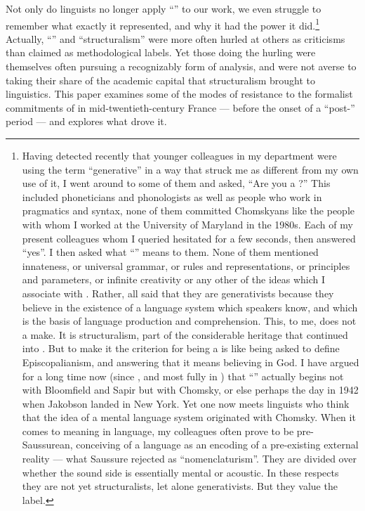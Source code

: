\documentclass[output=paper]{langscibook}
\begin{document}
Not only do linguists no longer apply ``'' to our work, we even struggle to remember what exactly it represented, and why it had the power it did.\footnote{Having detected recently that younger colleagues in my department were using the term ``generative'' in a way that struck me as different from my own use of it, I went around to some of them and asked, ``Are you a ?'' This included phoneticians and phonologists as well as people who work in pragmatics and syntax, none of them committed Chomskyans like the people with whom I worked at the University of Maryland in the 1980s. Each of my present colleagues whom I queried hesitated for a few seconds, then answered ``yes''. I then asked what ``'' means to them. None of them mentioned innateness, or universal grammar, or rules and representations, or principles and parameters, or infinite creativity or any other of the ideas which I associate with . Rather, all said that they are generativists because they believe in the existence of a language system which speakers know, and which is the basis of language production and comprehension. This, to me, does not a  make. It is structuralism, part of the considerable  heritage that continued into . But to make it the criterion for being a  is like being asked to define Episcopalianism, and answering that it means believing in God. I have argued for a long time now (since \citealt{Joseph1999}, and most fully in \citealt{Joseph2002}) that ``'' actually begins not with Bloomfield and Sapir but with Chomsky, or else perhaps the day in 1942 when Jakobson landed in New York. Yet one now meets linguists who think that the idea of a mental language system originated with Chomsky. When it comes to meaning in language, my colleagues often prove to be pre-Saussurean, conceiving of a language as an encoding of a pre-existing external reality — what Saussure rejected as ``nomenclaturism''. They are divided over whether the sound side is essentially mental or acoustic. In these respects they are not yet structuralists, let alone generativists. But they value the label.} Actually, ``'' and ``structuralism'' were more often hurled at others as criticisms than claimed as methodological labels. Yet those doing the hurling were themselves often pursuing a recognizably  form of analysis, and were not averse to taking their share of the academic capital that structuralism brought to linguistics. This paper examines some of the modes of resistance to the formalist commitments of  in mid-twentieth-century France — before the onset of a ``post-'' period — and explores what drove it.
\end{document}
